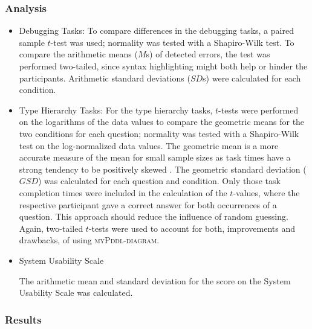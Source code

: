 \documentclass[runningheads]{llncs}
\newcommand{\mypddldiagram}{\textsc{myPddl-diagram}\xspace}
\begin{document}
\subsubsection{Analysis}

\begin{itemize}
\item Debugging Tasks: \nopagebreak To compare differences in the
  debugging tasks, a paired sample $t$-test was used; normality was
  tested with a Shapiro-Wilk test. To compare the arithmetic means
  ($M$s) of detected errors, the test was performed two-tailed, since
  syntax highlighting might both help or hinder the
  participants. Arithmetic standard deviations ($SD$s) were calculated
  for each condition.

\item Type Hierarchy Tasks:
\nopagebreak
  For the type hierarchy tasks, $t$-tests were performed on the
  logarithms of the data values to compare the geometric means for the
  two conditions for each question; normality was tested with a
  Shapiro-Wilk test on the log-normalized data values. The geometric
  mean is a more accurate measure of the mean for small sample sizes
  as task times have a strong tendency to be positively skewed
  \cite{sauro2012quantifying}. The geometric standard deviation
  ($GSD$) was calculated for each question and condition. Only those
  task completion times were included in the calculation of the
  $t$-values, where the respective participant gave a correct answer
  for both occurrences of a question. This approach should reduce the
  influence of random guessing. Again, two-tailed $t$-tests were used
  to account for both, improvements and drawbacks, of using
  \mypddldiagram.

\item System Usability Scale

  The arithmetic mean and standard deviation for the score on the
  System Usability Scale was calculated.
\end{itemize}

\subsubsection{Results}
\end{document}
